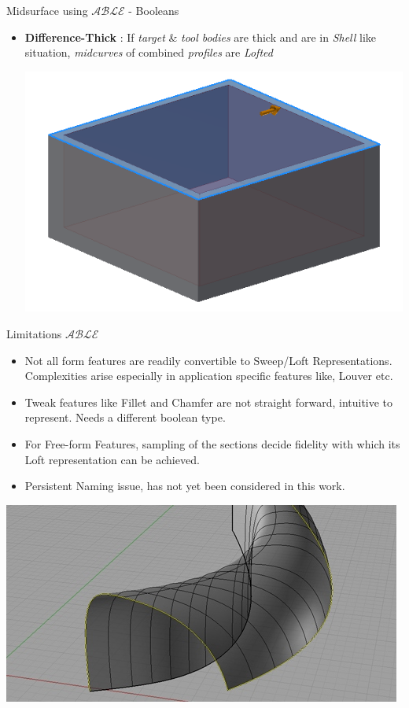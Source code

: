 \begin{frame}{Midsurface using $\mathcal{ABLE}$ - Booleans}
\begin{itemize}[noitemsep,label=\textbullet,topsep=2pt,parsep=2pt,partopsep=2pt]
\item {\bf Difference-Thick} : If {\em target} \& {\em tool bodies} are thick and are in {\em Shell} like situation, {\em midcurves} of combined {\em profiles} are {\em Lofted}  

\includegraphics[scale=0.115]{../Common/images//Midsurf_diffthick.png}
\end{itemize}
\end{frame}

\begin{frame}{Limitations $\mathcal{ABLE}$}
\begin{itemize}[noitemsep,label=\textbullet,topsep=2pt,parsep=2pt,partopsep=2pt]
\item Not all form features are readily convertible to Sweep/Loft Representations. Complexities arise especially in application specific features like, Louver etc.
\item Tweak features like Fillet and Chamfer are not straight forward, intuitive to represent. Needs a different boolean type.
\item For Free-form Features, sampling of the sections decide fidelity with which its Loft representation can be achieved.
\item Persistent Naming issue, has not yet been considered in this work.
\end{itemize}
\begin{center}\includegraphics[width=0.5\linewidth]{../Common/images/ComplexSweep.jpg}\end{center}
\end{frame}
